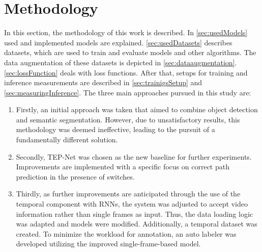 \chapter{Methodology}
\label{sec:methodology}


In this section, the methodology of this work is described.
In \autoref{sec:usedModels} used and implemented models are explained.
\autoref{sec:usedDatasets} describes datasets, which are used to train and evaluate models and other algorithms.
The data augmentation of these datasets is depicted in \autoref{sec:dataaugmentation}.
\autoref{sec:lossFunction} deals with loss functions.
After that, setups for training and inference measurements are described in \autoref{sec:trainigsSetup} and \autoref{sec:measuringInference}.
The three main approaches pursued in this study are:


\begin{enumerate}
    \item Firstly, an initial approach was taken that aimed to combine object detection and semantic segmentation.
    However, due to unsatisfactory results, this methodology was deemed ineffective, leading to the pursuit of a fundamentally different solution.
    \item Secondly, \ac{TEP}-Net \cite{tepNet2024} was chosen as the new baseline for further experiments.
    Improvements are implemented with a specific focus on correct path prediction in the presence of switches.
    \item Thirdly, as further improvements are anticipated through the use of the temporal component with \ac{RNN}s, the system was adjusted to accept video information rather than single frames as input.
    Thus, the data loading logic was adapted and models were modified.
    Additionally, a temporal dataset was created.
    To minimize the workload for annotation, an auto labeler was developed utilizing the improved single-frame-based model.
\end{enumerate}


